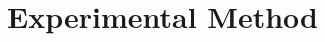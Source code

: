 \IfFileExists{IEEEtran.cls}{\ieeetrue\documentclass[conference]{IEEEtran}}{\ieeefalse\documentclass[twocolumn,10pt]{article}}
\begin{document}
\section{Experimental Method}\label{sec:data}
%
%
\end{document}
